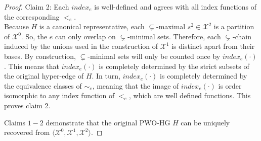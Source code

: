 \documentclass{article}
\theoremstyle{plain}
\theoremstyle{definition}
\theoremstyle{remark}
\newcommand{\cX}{\mathcal{X}}
\begin{document}
\begin{proof}
	Claim 2: Each $index_e$ is well-defined and agrees with all index functions of the corresponding $<_e$.\\
	Because $H$ is a canonical representative, each $\subsetneq$-maximal $s^2 \in \cX^2$ is a partition of $\cX^0$. So, the $e$ can only overlap on $\subsetneq$-minimal sets. Therefore, each $\subsetneq$-chain induced by the unions used in the construction of $\cX^1$ is distinct apart from their bases. By construction, $\subsetneq$-minimal sets will only be counted once by $index_e(\cdot)$. This means that $index_e(\cdot)$ is completely determined by the strict subsets of the original hyper-edge of $H$. In turn, $index_e(\cdot)$ is completely determined by the equivalence classes of $\sim_e$, meaning that the image of $index_e(\cdot)$ is order isomorphic to any index function of $<_e$, which are well defined functions. This proves claim 2.
	
	Claims $1-2$ demonstrate that the original PWO-HG $H$ can be uniquely recovered from $\langle \cX^0, \cX^1, \cX^2 \rangle$.
\end{proof}
\end{document}
